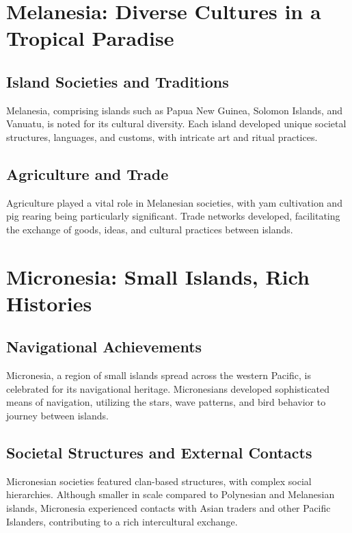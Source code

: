 \documentclass[a4paper,12pt]{book}
\begin{document}
\section{Melanesia: Diverse Cultures in a Tropical Paradise}
\label{sec:melanesia}

\subsection{Island Societies and Traditions}
\label{subsec:melanesia-societies-traditions}

Melanesia, comprising islands such as Papua New Guinea, Solomon Islands, and Vanuatu, is noted for its cultural diversity. Each island developed unique societal structures, languages, and customs, with intricate art and ritual practices.

\subsection{Agriculture and Trade}
\label{subsec:melanesia-agriculture-trade}

Agriculture played a vital role in Melanesian societies, with yam cultivation and pig rearing being particularly significant. Trade networks developed, facilitating the exchange of goods, ideas, and cultural practices between islands.

\section{Micronesia: Small Islands, Rich Histories}
\label{sec:micronesia}

\subsection{Navigational Achievements}
\label{subsec:micronesia-navigation}

Micronesia, a region of small islands spread across the western Pacific, is celebrated for its navigational heritage. Micronesians developed sophisticated means of navigation, utilizing the stars, wave patterns, and bird behavior to journey between islands.

\subsection{Societal Structures and External Contacts}
\label{subsec:micronesia-society-contacts}

Micronesian societies featured clan-based structures, with complex social hierarchies. Although smaller in scale compared to Polynesian and Melanesian islands, Micronesia experienced contacts with Asian traders and other Pacific Islanders, contributing to a rich intercultural exchange.
\end{document}

